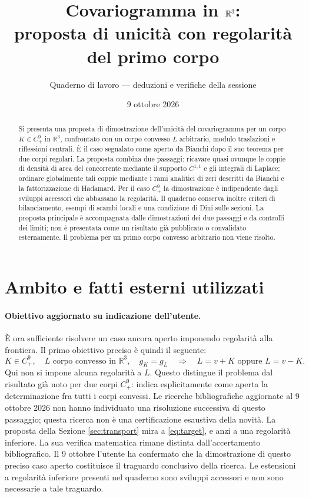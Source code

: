 \documentclass[11pt,a4paper]{article}
\title{Covariogramma in $\R^3$:\\proposta di unicità con regolarità del primo corpo}
\author{Quaderno di lavoro --- deduzioni e verifiche della sessione}
\date{9 ottobre 2026}
\theoremstyle{remark}
\newcommand{\R}{\mathbb R}
\begin{document}
\maketitle

\begin{abstract}
Si presenta una proposta di dimostrazione dell'unicità del covariogramma
per un corpo $K\in C^9_+$ in $\R^3$, confrontato con un corpo convesso
$L$ arbitrario, modulo traslazioni e riflessioni centrali. È il caso
segnalato come aperto da Bianchi dopo il suo teorema per due corpi
regolari. La proposta combina due passaggi: ricavare quasi ovunque
le coppie di densità di area del concorrente mediante il supporto
$C^{1,1}$ e gli integrali di Laplace; ordinare globalmente tali coppie
mediante i rami analitici di zeri descritti da Bianchi e la
fattorizzazione di Hadamard. Per il caso $C^9_+$ la dimostrazione è
indipendente dagli sviluppi accessori che abbassano la regolarità.
Il quaderno conserva inoltre criteri di bilanciamento, esempi di scambi
locali e una condizione di Dini sulle sezioni. La proposta principale
è accompagnata dalle dimostrazioni dei due passaggi e da controlli
dei limiti; non è presentata come un risultato già pubblicato o
convalidato esternamente. Il problema per un primo corpo convesso
arbitrario non viene risolto.
\end{abstract}

\section{Ambito e fatti esterni utilizzati}
\paragraph{Obiettivo aggiornato su indicazione dell'utente.}
È ora sufficiente risolvere un caso ancora aperto imponendo regolarità
alla frontiera. Il primo obiettivo preciso è quindi il seguente:
\begin{equation}\label{eq:target}
K\in C^9_+,\quad L\text{ corpo convesso in }\R^3,\quad g_K=g_L
\quad\Longrightarrow\quad L=v+K\text{ oppure }L=v-K.
\end{equation}
Qui non si impone alcuna regolarità a $L$. Questo distingue il problema
dal risultato già noto per due corpi $C^9_+$: \cite[Teorema 3.25 e
paragrafo immediatamente successivo, p.~23 del manoscritto]{B23}
indica esplicitamente come aperta la determinazione fra tutti i corpi
convessi. Le ricerche bibliografiche aggiornate al 9 ottobre 2026 non
hanno individuato una risoluzione successiva di questo passaggio;
questa ricerca non è una certificazione esaustiva della novità.
La proposta della Sezione \ref{sec:transport} mira a
\eqref{eq:target}, e anzi a una regolarità inferiore. La sua verifica
matematica rimane distinta dall'accertamento bibliografico.
Il 9 ottobre l'utente ha confermato che la dimostrazione di questo
preciso caso aperto costituisce il traguardo conclusivo della ricerca.
Le estensioni a regolarità inferiore presenti nel quaderno sono
sviluppi accessori e non sono necessarie a tale traguardo.
\end{document}
